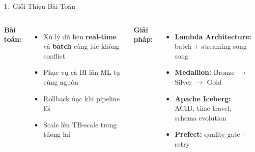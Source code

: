 \documentclass[aspectratio=169, 12pt]{beamer}
\begin{document}
\begin{frame}[t]{1.\ Gi\H{o}i Thi\d{e}u B\`{a}i To\'{a}n}
\begin{columns}[T]
  \textbf{\color{midblue}B\`{a}i to\'{a}n:}
  \begin{itemize}[leftmargin=1.2em, itemsep=4pt]
    \item X\h{u} l\'{y} d\~{u} li\d{e}u \textbf{real-time} v\`{a}
          \textbf{batch} c\`{u}ng l\'{u}c kh\^{o}ng conflict
    \item Ph\d{u}c v\d{u} c\h{a} BI l\~{a}n ML t\d{u} c\`{u}ng ngu\`{o}n
    \item Rollback \dj{}\h{u}\d{o}c khi pipeline l\~{o}i
    \item Scale l\^{e}n TB-scale trong t\h{u}\o{}ng lai
  \end{itemize}

  \textbf{\color{midblue}Gi\h{a}i ph\'{a}p:}
  \begin{itemize}[leftmargin=1.2em, itemsep=4pt]
    \item \textbf{Lambda Architecture:} batch + streaming song song
    \item \textbf{Medallion:} Bronze $\to$ Silver $\to$ Gold
    \item \textbf{Apache Iceberg:} ACID, time travel, schema evolution
    \item \textbf{Prefect:} quality gate + retry
  \end{itemize}
\end{columns}
\end{frame}
\end{document}
